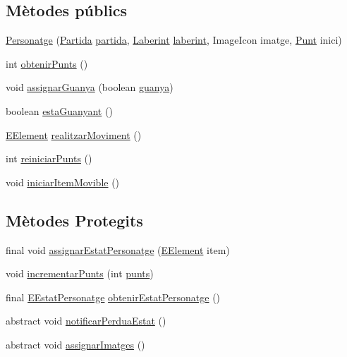 \subsection*{Mètodes públics}
\begin{DoxyCompactItemize}
\item 
\hyperlink{classlogica_1_1_personatge_af207e20f6a0494a46e710d8c9f33ccff}{Personatge} (\hyperlink{classlogica_1_1_partida}{Partida} \hyperlink{classlogica_1_1_item_movible_ace55b4918a7f671f89ed3109c91359e4}{partida}, \hyperlink{classlogica_1_1laberints_1_1_laberint}{Laberint} \hyperlink{classlogica_1_1_item_movible_a97036130b7376d77776427ca126f6fb5}{laberint}, Image\+Icon imatge, \hyperlink{classlogica_1_1_punt}{Punt} inici)
\item 
int \hyperlink{classlogica_1_1_personatge_a9c68a159bb580a73ae28ce692ab5c92d}{obtenir\+Punts} ()
\item 
void \hyperlink{classlogica_1_1_personatge_a32871fa2793634b05a0973ceec438560}{assignar\+Guanya} (boolean \hyperlink{classlogica_1_1_personatge_a0c30dc6ca85f941043ae4a27e7583c67}{guanya})
\item 
boolean \hyperlink{classlogica_1_1_personatge_a45c54c34068a2d0c0ee47c0222c6d6c8}{esta\+Guanyant} ()
\item 
\hyperlink{enumlogica_1_1enumeracions_1_1_e_element}{E\+Element} \hyperlink{classlogica_1_1_personatge_a39387dbfebd1936e63c29c8a9dd85bb1}{realitzar\+Moviment} ()
\item 
int \hyperlink{classlogica_1_1_personatge_afed860920a63cbd1efe126315a7370f4}{reiniciar\+Punts} ()
\item 
void \hyperlink{classlogica_1_1_personatge_a5f171d79a5a8ca6d0184a250456c44d1}{iniciar\+Item\+Movible} ()
\end{DoxyCompactItemize}
\subsection*{Mètodes Protegits}
\begin{DoxyCompactItemize}
\item 
final void \hyperlink{classlogica_1_1_personatge_a8b39023213405003380501bff8fdee6b}{assignar\+Estat\+Personatge} (\hyperlink{enumlogica_1_1enumeracions_1_1_e_element}{E\+Element} item)
\item 
void \hyperlink{classlogica_1_1_personatge_a72434a1f940bd10caa6e2d80b129adda}{incrementar\+Punts} (int \hyperlink{classlogica_1_1_personatge_a2a46aceef25eeae45072cf2e6ece1506}{punts})
\item 
final \hyperlink{enumlogica_1_1_personatge_1_1_e_estat_personatge}{E\+Estat\+Personatge} \hyperlink{classlogica_1_1_personatge_aa82af20d5b19f0a0401614ec642be499}{obtenir\+Estat\+Personatge} ()
\item 
abstract void \hyperlink{classlogica_1_1_personatge_add25ab819bc64920f353eedeac26efcf}{notificar\+Perdua\+Estat} ()
\item 
abstract void \hyperlink{classlogica_1_1_personatge_ae7f9cdfd1b01d6c7eaee1675decfaeca}{assignar\+Imatges} ()
\end{DoxyCompactItemize}
